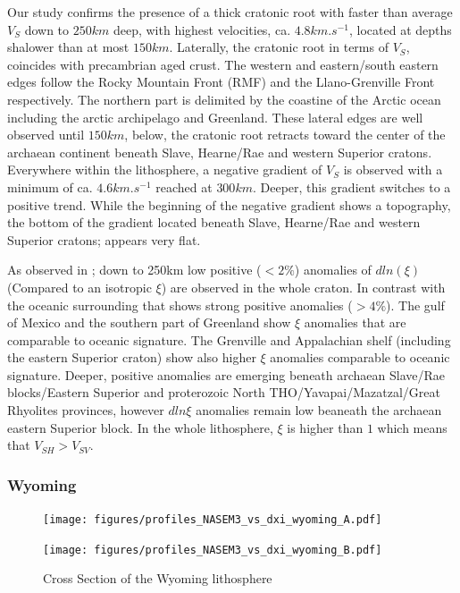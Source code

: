 \documentclass[12pt]{article}
\begin{document}

Our study confirms the presence of a thick cratonic root with faster than average $V_S$ down to $250km$ deep, with highest velocities, ca. $4.8km.s^{-1}$, located at depths shalower than at most $150km$. 
Laterally, the cratonic root in terms of $V_S$, coincides with precambrian aged crust. 
The western and eastern/south eastern edges follow the Rocky Mountain Front (RMF) and the Llano-Grenville Front respectively. 
The northern part is delimited by the coastine of the Arctic ocean including the arctic archipelago and Greenland. 
These lateral edges are well observed until $150km$, below, the cratonic root retracts toward the center of the archaean continent beneath Slave, Hearne/Rae and western Superior cratons. 
Everywhere within the lithosphere, a negative gradient of $V_S$ is observed with a minimum of ca. $4.6km.s^{-1}$ reached at $300km$. 
Deeper, this gradient switches to a positive trend. While the beginning of the negative gradient shows a topography, the bottom of the gradient located beneath Slave, Hearne/Rae and western Superior cratons; appears very flat.

As observed in \cite{gung2003global}; down to 250km low positive ($< 2\%$) anomalies of $dln(\xi)$ (Compared to an isotropic $\xi$) are observed in the whole craton. In contrast with the oceanic surrounding that shows strong positive anomalies ($> 4\%$). 
The gulf of Mexico and the southern part of Greenland show $\xi$ anomalies that are comparable to oceanic signature. 
The Grenville and Appalachian shelf (including the eastern Superior craton) show also higher $\xi$ anomalies comparable to oceanic signature. 
Deeper, positive anomalies are emerging beneath archaean Slave/Rae blocks/Eastern Superior and proterozoic North THO/Yavapai/Mazatzal/Great Rhyolites provinces, however $dln\xi$ anomalies remain low beaneath the archaean eastern Superior block. 
In the whole lithosphere, $\xi$ is higher than $1$ which means that $V_{SH} > V_{SV}$. 


\subsubsection{Wyoming}
\begin{figure}[h]
	\begin{minipage}{0.5\linewidth}
		\centerline{\texttt{[image: figures/profiles\_NASEM3\_vs\_dxi\_wyoming\_A.pdf]}}
	\end{minipage}
	\hfill
	\begin{minipage}{0.5\linewidth}
		\centerline{\texttt{[image: figures/profiles\_NASEM3\_vs\_dxi\_wyoming\_B.pdf]}}
	\end{minipage}

	\caption{Cross Section of the Wyoming lithosphere}
	\label{wyomingcross}

\end{figure}
\end{document}

